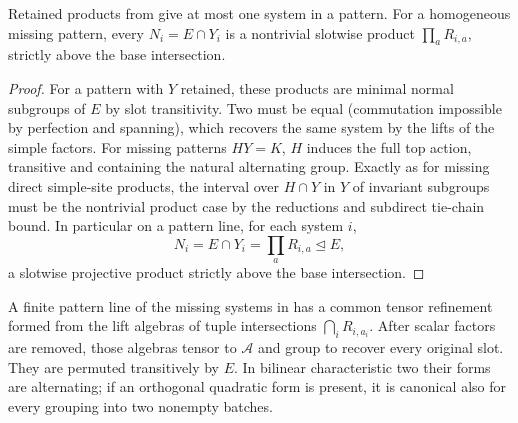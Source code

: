 \begin{lemma}\label{c:tensor-products}
Retained products from  give at most one system in a pattern. For a homogeneous missing pattern, every \(N_i=E\cap Y_i\) is a nontrivial slotwise product \(\prod_aR_{i,a}\), strictly above the base intersection.
\end{lemma}

\begin{proof}
For a pattern with \(Y\) retained, these products are minimal normal subgroups of \(E\) by slot transitivity. Two must be equal (commutation impossible by perfection and spanning), which recovers the same system by the lifts of the simple factors. For missing patterns \(HY=K\), \(H\) induces the full top action, transitive and containing the natural alternating group. Exactly as for missing direct simple-site products, the interval over \(H\cap Y\) in \(Y\) of invariant subgroups must be the nontrivial product case by the reductions and subdirect tie-chain bound. In particular on a pattern line, for each system \(i\),
\[
 N_i=E\cap Y_i=\prod_a R_{i,a}\trianglelefteq E,
\]
a slotwise projective product strictly above the base intersection.
\end{proof}

\begin{lemma}\label{c:tensor-refinement}
A finite pattern line of the missing systems in  has a common tensor refinement formed from the lift algebras of tuple intersections \(\bigcap_iR_{i,a_i}\). After scalar factors are removed, those algebras tensor to \(\mathcal A\) and group to recover every original slot. They are permuted transitively by \(E\). In bilinear characteristic two their forms are alternating; if an orthogonal quadratic form is present, it is canonical also for every grouping into two nonempty batches.
\end{lemma}


